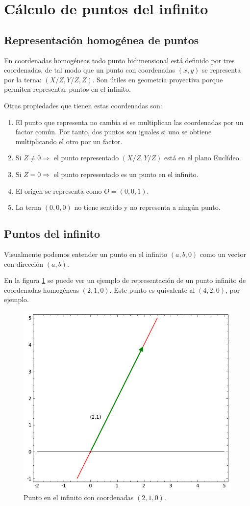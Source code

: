 \documentclass[a4,12pt]{article}
\begin{document}
\section{Cálculo de puntos del infinito}
\subsection{Representación homogénea de puntos}
En coordenadas homogéneas todo punto bidimensional está definido por tres coordenadas, de tal modo que un punto con coordenadas $(x, y)$ se representa por la terna: $(X/Z, Y/Z, Z)$. Son útiles en geometría proyectiva porque permiten representar puntos en el infinito.

Otras propiedades que tienen estas coordenadas son:
\begin{enumerate}
\item El punto que representa no cambia si se multiplican las coordenadas por un factor común. Por tanto, dos puntos son iguales si uno se obtiene multiplicando el otro por un factor.
\item Si $Z\neq0 \Rightarrow$ el punto representado $(X/Z, Y/Z)$ está en el plano Euclídeo.
\item Si $Z=0\Rightarrow$ el punto representado es un punto en el infinito.
\item El origen se representa como $O=(0,0,1)$.
\item La terna $(0,0,0)$ no tiene sentido y no representa a ningún punto.
\end{enumerate}

\subsection{Puntos del infinito}

Visualmente podemos entender un punto en el infinito $(a,b,0)$ como un vector con dirección $(a,b)$.

En la figura \ref{fig:puntoinfinito} se puede ver un ejemplo de representación de un punto infinito de coordenadas homogéneas $(2,1,0)$. Este punto es quivalente al $(4,2,0)$, por ejemplo.

\begin{figure}
\begin{center}
\includegraphics[width=.5\linewidth]{imagenes/puntoinfinito}
\end{center}
\caption{Punto en el infinito con coordenadas $(2,1,0)$.}
\label{fig:puntoinfinito}
\end{figure}
\end{document}
